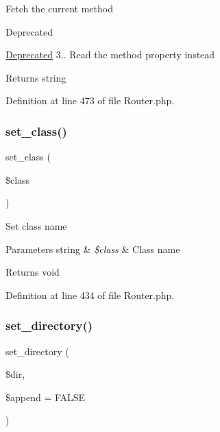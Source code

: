 Fetch the current method

\begin{DoxyRefDesc}{Deprecated}
\item[\mbox{\hyperlink{deprecated__deprecated000004}{Deprecated}}]3.. Read the \textquotesingle{}method\textquotesingle{} property instead \end{DoxyRefDesc}
\begin{DoxyReturn}{Returns}
string 
\end{DoxyReturn}


Definition at line 473 of file Router.\+php.

\mbox{\label{class_c_i___router_afbb540df5c161fe69909a5f8182f910f}} 
\subsubsection{\texorpdfstring{set\_class()}{set\_class()}}
{\footnotesize\ttfamily set\+\_\+class (\begin{DoxyParamCaption}\item[{}]{\$class }\end{DoxyParamCaption})}

Set class name


\begin{DoxyParams}[1]{Parameters}
string & {\em \$class} & Class name \\
\hline
\end{DoxyParams}
\begin{DoxyReturn}{Returns}
void 
\end{DoxyReturn}


Definition at line 434 of file Router.\+php.

\mbox{\label{class_c_i___router_a80573f758526ffa1beba61be5d45baff}} 
\subsubsection{\texorpdfstring{set\_directory()}{set\_directory()}}
{\footnotesize\ttfamily set\+\_\+directory (\begin{DoxyParamCaption}\item[{}]{\$dir,  }\item[{}]{\$append = {\ttfamily FALSE} }\end{DoxyParamCaption})}

